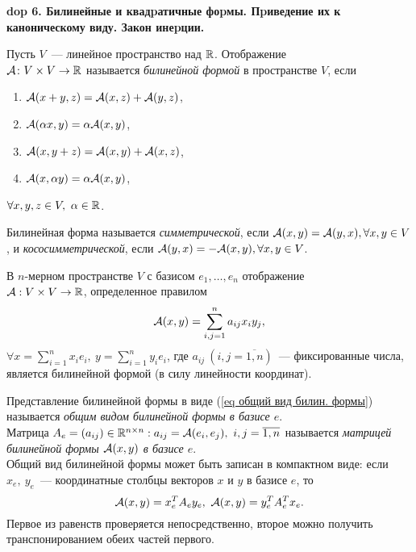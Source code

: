 \setcounter{section}{4}
\setcounter{subsection}{6}
\setcounter{equation}{0}
\textbf{\LARGE dop 6. Билинейные и квадpатичные фоpмы. Пpиведение их к каноническому виду. Закон инеpции.}


\begin{definition}
Пусть $V$~--- линейное пространство над ${\mathbb{R}}$. Отображение\\ ${\mathcal{A}}\colon V\times V\to {\mathbb{R}}$ называется \emph{билинейной формой} в пространстве $V$, если
\begin{enumerate}
    \item ${\mathcal{A}}(x+y,z)={\mathcal{A}}(x,z)+{\mathcal{A}}(y,z)$,
    \item ${\mathcal{A}}(\alpha x,y)=\alpha{\mathcal{A}}(x,y)$,
    \item ${\mathcal{A}}(x,y+z)={\mathcal{A}}(x,y)+{\mathcal{A}}(x,z)$,
    \item ${\mathcal{A}}(x,\alpha y)=\alpha{\mathcal{A}}(x,y)$,
\end{enumerate}
$\forall x,y,z\in V,~\alpha\in{\mathbb{R}}$.
\end{definition}

\begin{definition}
Билинейная форма называется \emph{симметрической}, если ${\mathcal{A}}(x,y)={\mathcal{A}}(y,x),\forall x,y\in V$, и \emph{кососимметрической}, если ${\mathcal{A}}(y,x)=-{\mathcal{A}}(x,y),\forall x,y\in V$.
\end{definition}

\begin{example}
В $n$-мерном пространстве $V$ с базисом $e_1,\ldots,e_n$ отображение\\ ${\mathcal{A}}:V\times V\to{\mathbb{R}}$, определенное правилом
\begin{equation}
\label{eq общий вид билин. формы}
    {\mathcal{A}}(x,y)=\sum_{i,j=1}^na_{ij}x_iy_j,
\end{equation}
$\forall x=\sum_{i=1}^nx_ie_i,~y=\sum_{i=1}^ny_ie_i$, где $a_{ij}~(i,j=\overline{1,n})$~--- фиксированные числа, является билинейной формой (в силу линейности координат).
\end{example}

\begin{definition}
Представление билинейной формы в виде (\eqref{eq общий вид билин. формы}) называется \emph{общим видом билинейной формы в базисе $e$}.\\
Матрица $A_e=(a_{ij})\in{\mathbb{R}}^{n\times n}:a_{ij}={\mathcal{A}}(e_i,e_j),~i,j=\overline{1,n}$ называется \emph{матрицей билинейной формы ${\mathcal{A}}(x,y)$ в базисе $e$}.\\
Общий вид билинейной формы может быть записан в компактном виде: если $x_e,~y_e$~--- координатные столбцы векторов $x$ и $y$ в базисе $e$, то
\begin{equation}
\label{eq комп. вид билин. формы}
    {\mathcal{A}}(x,y)=x_e^TA_ey_e,~{\mathcal{A}}(x,y)=y_e^TA_e^Tx_e.
\end{equation}
Первое из равенств проверяется непосредственно, второе можно получить транспонированием обеих частей первого.
\end{definition}

